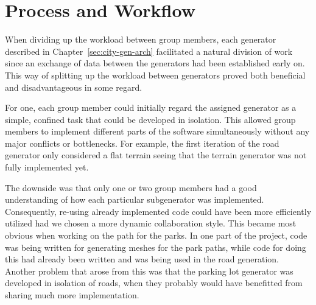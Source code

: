 \section{Process and Workflow}
When dividing up the workload between group members, each generator described in Chapter~\ref{sec:city-gen-arch} facilitated a natural division of work since an exchange of data between the generators had been established early on.
This way of splitting up the workload between generators proved both beneficial and disadvantageous in some regard.

For one, each group member could initially regard the assigned generator as a simple, confined task that could be developed in isolation.
This allowed group members to implement different parts of the software simultaneously without any major conflicts or bottlenecks.
For example, the first iteration of the road generator only considered a flat terrain seeing that the terrain generator was not fully implemented yet.

The downside was that only one or two group members had a good understanding of how each particular subgenerator was implemented.
Consequently, re-using already implemented code could have been more efficiently utilized had we chosen a more dynamic collaboration style.
This became most obvious when working on the path for the parks.
In one part of the project, code was being written for generating meshes for the park paths, while code for doing this had already been written and was being used in the road generation.
Another problem that arose from this was that the parking lot generator was developed in isolation of roads, when they probably would have benefitted from sharing much more implementation.

